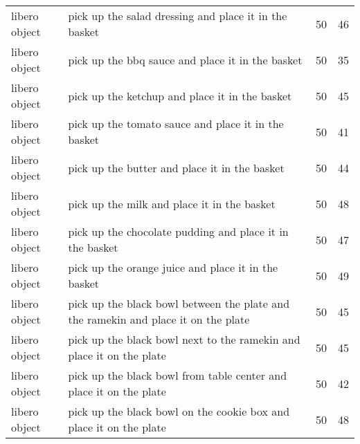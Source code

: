 \begin{table}[]
\begin{tabular}{llll}
libero object & pick up the salad dressing and place it in the basket                                    & 50         & 46                                                              \\
libero object & pick up the bbq sauce and place it in the basket                                         & 50         & 35                                                              \\
libero object & pick up the ketchup and place it in the basket                                           & 50         & 45                                                              \\
libero object & pick up the tomato sauce and place it in the basket                                      & 50         & 41                                                              \\
libero object & pick up the butter and place it in the basket                                            & 50         & 44                                                              \\
libero object & pick up the milk and place it in the basket                                              & 50         & 48                                                              \\
libero object & pick up the chocolate pudding and place it in the basket                                 & 50         & 47                                                              \\
libero object & pick up the orange juice and place it in the basket                                      & 50         & 49                                                              \\
libero object & pick up the black bowl between the plate and the ramekin and place it on the plate       & 50         & 45                                                              \\
libero object & pick up the black bowl next to the ramekin and place it on the plate                     & 50         & 45                                                              \\
libero object & pick up the black bowl from table center and place it on the plate                       & 50         & 42                                                              \\
libero object & pick up the black bowl on the cookie box and place it on the plate                       & 50         & 48                                                              \\

\end{tabular}
\end{table}
